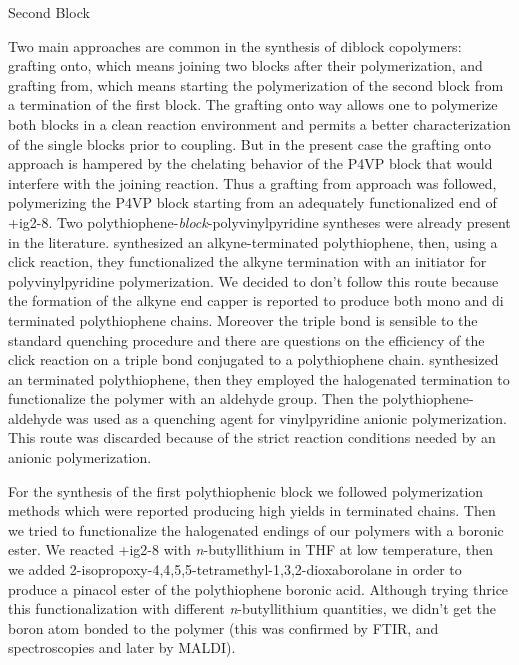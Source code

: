 \clearpage
\begin{section}{Second Block}

Two main approaches are common in the synthesis of diblock copolymers: grafting onto, which means joining two blocks after their polymerization, and grafting from, which means starting the polymerization of the second block from a termination of the first block. The grafting onto way allows one to polymerize both blocks in a clean reaction environment and permits a better characterization of the single blocks prior to coupling. 
But in the present case the grafting onto approach is hampered by the chelating behavior of the \gls{P4VP} block that would interfere with the joining reaction. 
Thus a grafting from approach was followed, polymerizing the \gls{P4VP} block starting from an adequately functionalized end of \cmpd+{ig2-8}. 
Two poly\-thio\-phene-\textit{block}-poly\-vinyl\-pyridine syntheses were already present in the literature.  synthesized an alkyne-terminated poly\-thio\-phene, then, using a click reaction, they functionalized the alkyne termination with an initiator for poly\-vinyl\-pyridine polymerization. 
We decided to don't follow this route because the formation of the alkyne end capper is reported to produce both mono and di terminated poly\-thio\-phene chains. Moreover the triple bond is sensible to the standard quenching procedure and there are questions on the efficiency of the click reaction on a triple bond conjugated to a poly\-thio\-phene chain. 
 synthesized an  terminated poly\-thio\-phene, then they employed the halogenated termination to functionalize the polymer with an aldehyde group. Then the polythio\-phene-aldehyde was used as a quenching agent for vinyl\-pyridine anionic polymerization. This route was discarded because of the strict reaction conditions needed by an anionic polymerization.

For the synthesis of the first polythio\-phenic block we followed polymerization methods which were reported producing high yields in  terminated chains. 
Then we tried to functionalize the halogenated endings of our polymers with a boronic ester. We reacted \cmpd+{ig2-8} with \textit{n}-butyl\-lithium in \gls{THF} at low temperature, then we added 2-iso\-prop\-oxy-4,4,5,5-tetra\-methyl-1,3,2-di\-oxa\-borolane in order to produce a pinacol ester of the poly\-thio\-phene boronic acid. Although trying thrice this functionalization with different \textit{n}-butyl\-lithium quantities, we didn't get the boron atom bonded to the polymer (this was confirmed by \gls{FTIR}, {\HNMR} and {\CNMR} spectroscopies and later by \gls{MALDI}). 


\end{section}
